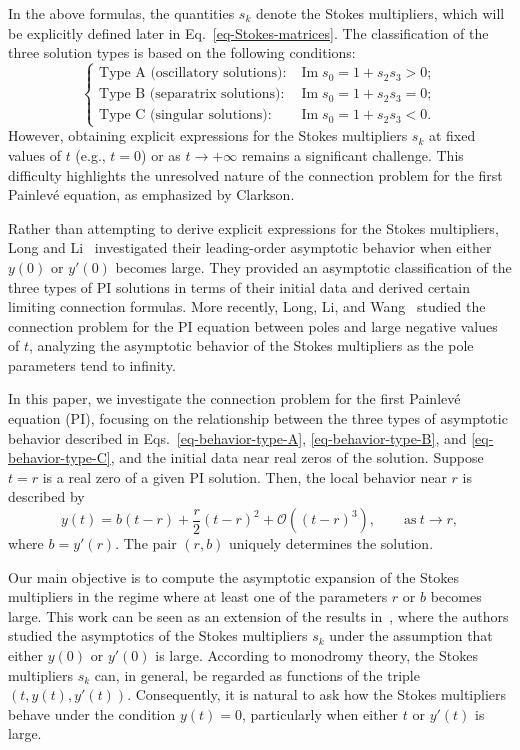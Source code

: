 \documentclass[12pt]{article}
\theoremstyle{plain}
\theoremstyle{definition}
\numberwithin{equation}{section}
\renewcommand\Im{\operatorname{Im}}
\begin{document}
In the above formulas, the quantities $s_k$ denote the Stokes multipliers, which will be explicitly defined later in Eq.~\eqref{eq-Stokes-matrices}. The classification of the three solution types is based on the following conditions:
\begin{equation}\label{eq-classifed-by-stokes}
\begin{cases}
\text{Type A (oscillatory solutions)}: & \Im s_{0}=1+s_{2}s_{3}>0;\\
\text{Type B (separatrix solutions)}: & \Im s_{0}=1+s_{2}s_{3}=0;\\
\text{Type C (singular solutions)}:  & \Im s_{0}=1+s_{2}s_{3}<0.
\end{cases}
\end{equation}
However, obtaining explicit expressions for the Stokes multipliers $s_k$ at fixed values of $t$ (e.g., $t = 0$) or as $t \to +\infty$ remains a significant challenge. This difficulty highlights the unresolved nature of the connection problem for the first Painlev\'e equation, as emphasized by Clarkson.


Rather than attempting to derive explicit expressions for the Stokes multipliers, Long and Li~\cite{LongLi} investigated their leading-order asymptotic behavior when either $y(0)$ or $y'(0)$ becomes large. They provided an asymptotic classification of the three types of PI solutions in terms of their initial data and derived certain limiting connection formulas. More recently, Long, Li, and Wang~\cite{LongLiWang} studied the connection problem for the PI equation between poles and large negative values of $t$, analyzing the asymptotic behavior of the Stokes multipliers as the pole parameters tend to infinity.

\medskip

In this paper, we investigate the connection problem for the first Painlev\'e equation (PI), focusing on the relationship between the three types of asymptotic behavior described in Eqs.~\eqref{eq-behavior-type-A}, \eqref{eq-behavior-type-B}, and \eqref{eq-behavior-type-C}, and the initial data near real zeros of the solution. Suppose $t = r$ is a real zero of a given PI solution. Then, the local behavior near $r$ is described by
\begin{equation}\label{eq-behavior-at-zero}
y(t) =b(t-r) + \frac{r}{2}(t-r)^2+\mathcal{O}((t-r)^{3}), \qquad\text{as}~ t \to r,
\end{equation}
where $b=y'(r)$. The pair $(r, b)$ uniquely determines the solution.

Our main objective is to compute the asymptotic expansion of the Stokes multipliers in the regime where at least one of the parameters $r$ or $b$ becomes large. This work can be seen as an extension of the results in~\cite{LongLi}, where the authors studied the asymptotics of the Stokes multipliers $s_k$ under the assumption that either $y(0)$ or $y'(0)$ is large. According to monodromy theory, the Stokes multipliers $s_k$ can, in general, be regarded as functions of the triple $(t, y(t), y'(t))$. Consequently, it is natural to ask how the Stokes multipliers behave under the condition $y(t) = 0$, particularly when either $t$ or $y'(t)$ is large.
\end{document}
